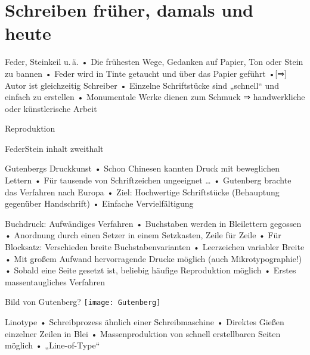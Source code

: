 

\usepackage{epic}
\graphicspath{{../Mediales/}}


\section{Schreiben früher, damals und heute}
\begin{frame}{Feder, Steinkeil u.\,ä.}
• Die frühesten Wege, Gedanken auf Papier, Ton oder Stein zu bannen
• Feder wird in Tinte getaucht und über das Papier geführt
•[⇒] Autor ist gleichzeitig Schreiber
• Einzelne Schriftstücke sind „schnell“ und einfach zu erstellen
• Monumentale Werke dienen zum Schmuck ⇒ handwerkliche oder künstlerische Arbeit
\•
\end{frame}

\begin{frame}{Reproduktion}
\begin{twoblock}{Feder}{Stein}
inhalt
\nextblock
zweithalt
\end{twoblock}
\end{frame}


\begin{frame}{Gutenbergs Druckkunst}
• Schon Chinesen kannten Druck mit beweglichen Lettern
• Für tausende von Schriftzeichen ungeeignet …
• Gutenberg brachte das Verfahren nach Europa
• Ziel: Hochwertige Schriftstücke (Behauptung gegenüber Handschrift)
• Einfache Vervielfältigung
\• 
\end{frame}

\begin{frame}{Buchdruck: Aufwändiges Verfahren}
• Buchstaben werden in Bleilettern gegossen
• Anordnung durch einen Setzer in einem Setzkasten, Zeile für Zeile
• Für Blocksatz: Verschieden breite Buchstabenvarianten
• Leerzeichen variabler Breite
• Mit großem Aufwand hervorragende Drucke möglich (auch Mikrotypographie!)
• Sobald eine Seite gesetzt ist, beliebig häufige Reproduktion möglich
• Erstes massentaugliches Verfahren
\•
\end{frame}

\begin{frame}[plain]
\kern-1cm \hfill Bild von Gutenberg? \hfill \texttt{[image: Gutenberg]}\hfill\hfill
\end{frame}

\begin{frame}{Linotype}
• Schreibprozess ähnlich einer Schreibmaschine
• Direktes Gießen einzelner Zeilen in Blei
• Massenproduktion von schnell erstellbaren Seiten möglich
• „Line-of-Type“
\• 
\end{frame}

